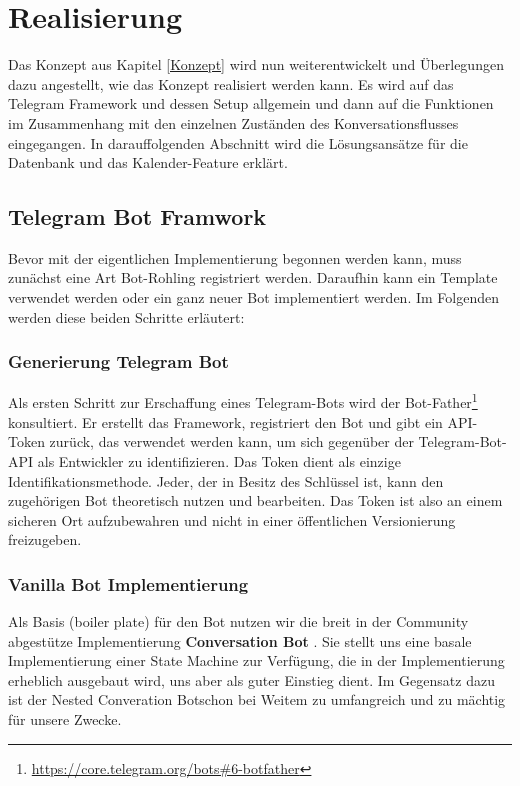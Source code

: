 \label{Realisierung}
\chapter{Realisierung}

    Das Konzept aus Kapitel \ref*{Konzept} wird nun weiterentwickelt und Überlegungen dazu angestellt, wie das Konzept realisiert werden kann. Es wird auf das Telegram Framework und dessen Setup allgemein und dann auf die Funktionen im Zusammenhang mit den einzelnen Zuständen des Konversationsflusses eingegangen. In darauffolgenden Abschnitt wird die Lösungsansätze für die Datenbank und das Kalender-Feature erklärt.

    \section{Telegram Bot Framwork}
        Bevor mit der eigentlichen Implementierung begonnen werden kann, muss zunächst eine Art Bot-Rohling registriert werden. Daraufhin kann ein Template verwendet werden oder ein ganz neuer Bot implementiert werden. Im Folgenden werden diese beiden Schritte erläutert:

        \subsection{Generierung Telegram Bot} \label{Realisierung: botfather}
            Als ersten Schritt zur Erschaffung eines Telegram-Bots wird der Bot-Father\footnote{\url{https://core.telegram.org/bots\#6-botfather}} konsultiert. Er erstellt das Framework, registriert den Bot und gibt ein API-Token zurück, das verwendet werden kann, um sich gegenüber der Telegram-Bot-API als Entwickler zu identifizieren. \cite{telegramAPI} Das Token dient als einzige Identifikationsmethode. Jeder, der in Besitz des Schlüssel ist, kann den zugehörigen Bot theoretisch nutzen und bearbeiten. Das Token ist also an einem sicheren Ort aufzubewahren und nicht in einer öffentlichen Versionierung freizugeben.

        \subsection{Vanilla Bot Implementierung}
            Als Basis (boiler plate) für den Bot nutzen wir die breit in der Community abgestütze Implementierung \textbf{Conversation Bot} \cite{conversationBot}. Sie stellt uns eine basale Implementierung einer State Machine zur Verfügung, die in der Implementierung erheblich ausgebaut wird, uns aber als guter Einstieg dient. Im Gegensatz dazu ist der \glqq Nested Converation Bot\grqq schon bei Weitem zu umfangreich und zu mächtig für unsere Zwecke.
            
